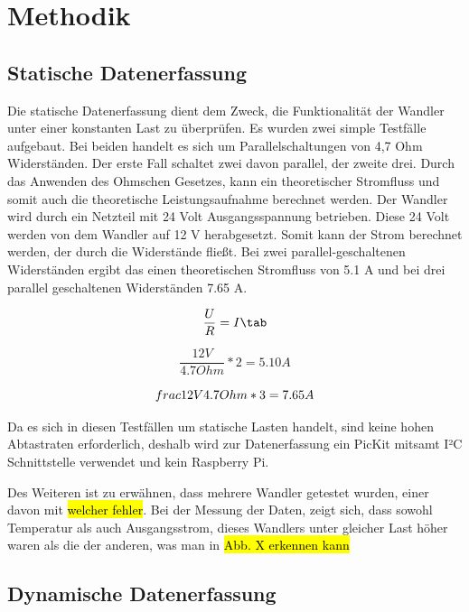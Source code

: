 \section{Methodik}
\subsection{Statische Datenerfassung}

Die statische Datenerfassung dient dem Zweck, die Funktionalität der Wandler unter einer konstanten Last zu überprüfen. Es wurden zwei simple Testfälle aufgebaut. Bei beiden handelt es sich um Parallelschaltungen von 4,7 Ohm Widerständen. Der erste Fall schaltet zwei davon parallel, der zweite drei. Durch das Anwenden des Ohmschen Gesetzes, kann ein theoretischer Stromfluss und somit auch die theoretische Leistungsaufnahme berechnet werden. Der Wandler wird durch ein Netzteil mit 24 Volt Ausgangsspannung betrieben. Diese 24 Volt werden von dem Wandler auf 12 V herabgesetzt. Somit kann der Strom berechnet werden, der durch die Widerstände fließt. Bei zwei parallel-geschaltenen Widerständen ergibt das einen theoretischen Stromfluss von 5.1 A und bei drei parallel geschaltenen Widerständen 7.65 A.

\begin{equation}
\label{Ohmsches Gesetz}
\frac{U}{R} = I \tab
\end{equation}


\begin{equation}
\label{Ohmsches Gesetz}
\frac{12V}{4.7 Ohm}*2 = 5.10 A 
\end{equation}


\begin{equation}
\label{Ohmsches Gesetz}
\\frac{12V}{4.7 Ohm}*3 = 7.65 A 
\end{equation}


Da es sich in diesen Testfällen um statische Lasten handelt, sind keine hohen Abtastraten erforderlich, deshalb wird zur Datenerfassung ein PicKit mitsamt I²C Schnittstelle verwendet und kein Raspberry Pi. 

Des Weiteren ist zu erwähnen, dass mehrere Wandler getestet wurden, einer davon mit \hl{welcher fehler}. Bei der Messung der Daten, zeigt sich, dass sowohl Temperatur als auch Ausgangsstrom, dieses Wandlers unter gleicher Last höher waren als die der anderen, was man in \hl{Abb. X erkennen kann} 

\subsection{Dynamische Datenerfassung}

